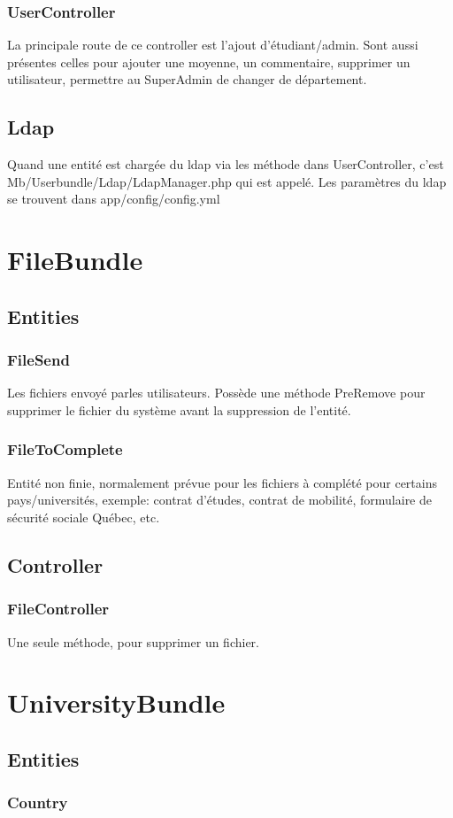 \subsubsection{UserController}
La principale route de ce controller est l'ajout d'étudiant/admin.
Sont aussi présentes celles pour ajouter une moyenne, un commentaire, supprimer un utilisateur, permettre au SuperAdmin de changer de département.


\subsection{Ldap}
Quand une entité est chargée du ldap via les méthode dans UserController, c'est Mb/Userbundle/Ldap/LdapManager.php qui est appelé.
Les paramètres du ldap se trouvent dans app/config/config.yml


\section{FileBundle}
\subsection{Entities}
\subsubsection{FileSend}
Les fichiers envoyé parles utilisateurs. Possède une méthode PreRemove pour supprimer le fichier du système avant la suppression de l'entité.

\subsubsection{FileToComplete}
Entité non finie, normalement prévue pour les fichiers à complété pour certains pays/universités, exemple: contrat d'études, contrat de mobilité, formulaire de sécurité sociale Québec, etc.


\subsection{Controller}
\subsubsection{FileController}
Une seule méthode, pour supprimer un fichier.


\section{UniversityBundle}
\subsection{Entities}
\subsubsection{Country}